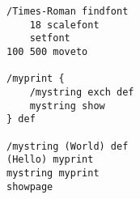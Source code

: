 \begin{verbatim}
/Times-Roman findfont
    18 scalefont
    setfont
100 500 moveto

/myprint {
    /mystring exch def
    mystring show
} def

/mystring (World) def
(Hello) myprint
mystring myprint
showpage
\end{verbatim}